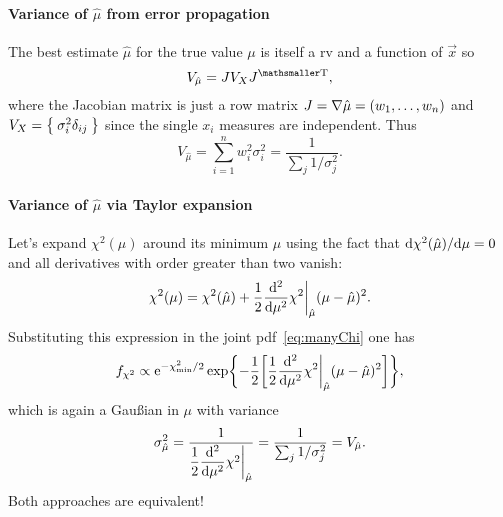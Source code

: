 \paragraph{Variance of $\hat\mu$ from error propagation}

The best estimate $\hat\mu$ for the true value $\mu$ is itself a \ac{rv} and a function of $\vec{x}$ so
\begin{equation}
	V_{\hat\mu} = JV_X\transpose{J},
\end{equation}
where the Jacobian matrix is just a row matrix $J = \V \hat\mu = (w_1,\dots,w_n)$ and $V_X = \Set{\sigma_i^2\delta_{ij}}$ since the single $x_i$ measures are independent.
Thus
\begin{equation}
	V_{\hat\mu} = \sum_{i=1}^n w_i^2\sigma_i^2 = \frac{1}{\sum_j 1/\sigma_j^2}.
\end{equation}


\paragraph{Variance of $\hat\mu$ via Taylor expansion}
Let's expand $\chi^2(\mu)$ around its minimum $\hat\mu$ using the fact that $\ud\chi^2(\hat\mu)/\!\ud\mu = 0$ and all derivatives with order greater than two vanish:
\begin{equation}
	\chi^2(\mu) = \chi^2(\hat\mu) +\frac{1}{2} \deriv[2]{}{\mu}\chi^2\bigg\rvert_{\hat\mu}(\mu-\hat\mu)^2.
\end{equation}\label{eq:chiSquareExpansion}
Substituting this expression in the joint \ac{pdf}~\eqref{eq:manyChi} one has
\begin{equation}
	f_{\chi^2} \propto \eu^{-\chi^2_{\textup{min}}/2}\exp\biggl\{ -\frac{1}{2} \biggl[\frac{1}{2} \deriv[2]{}{\mu}\chi^2\bigg\rvert_{\hat\mu}(\mu-\hat\mu)^2\biggr]\biggr\},
\end{equation}
which is again a Gau\ss{}ian in $\mu$ with variance
\begin{equation}
	\sigma^2_{\hat\mu} = \frac{1}{\dfrac{1}{2} \deriv[2]{}{\mu}\chi^2\bigg\rvert_{\hat\mu}} = \frac{1}{\sum_j 1/\sigma_j^2}   = V_{\hat\mu}.
\end{equation}
Both approaches are equivalent!


